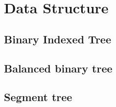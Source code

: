 \newpage
\section{Data Structure}

\subsection{Binary Indexed Tree}


\subsection{Balanced binary tree}

\subsection{Segment tree}

